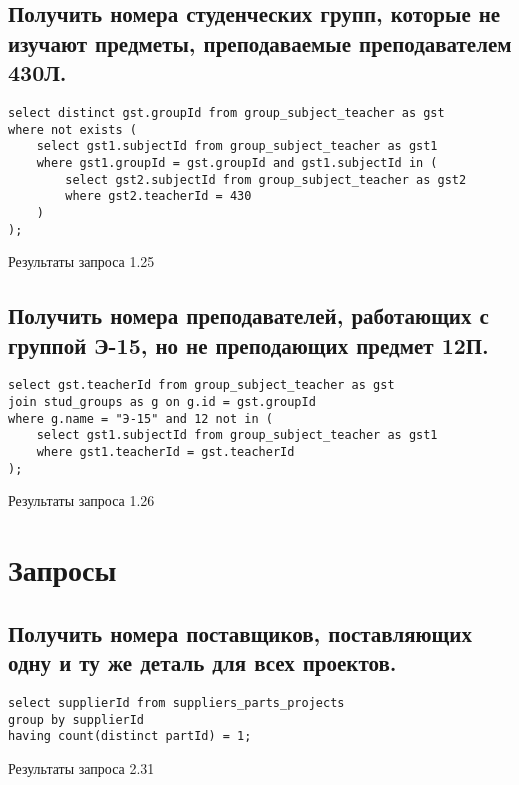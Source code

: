 \documentclass[a4paper,8pt]{article}
\begin{document}
\subsection{Получить номера студенческих групп, которые не изучают предметы, преподаваемые преподавателем 430Л.}
\begin{verbatim}
select distinct gst.groupId from group_subject_teacher as gst
where not exists (
	select gst1.subjectId from group_subject_teacher as gst1
    where gst1.groupId = gst.groupId and gst1.subjectId in (
		select gst2.subjectId from group_subject_teacher as gst2
        where gst2.teacherId = 430
    )
);
\end{verbatim}
\begin{table}[H]
\centering

\caption{Результаты запроса 1.25}
\end{table}

\subsection{Получить номера преподавателей, работающих с группой Э-15, но не преподающих предмет 12П.}
\begin{verbatim}
select gst.teacherId from group_subject_teacher as gst
join stud_groups as g on g.id = gst.groupId
where g.name = "Э-15" and 12 not in (
	select gst1.subjectId from group_subject_teacher as gst1
    where gst1.teacherId = gst.teacherId
);
\end{verbatim}
\begin{table}[H]
\centering

\caption{Результаты запроса 1.26}
\end{table}

\section{Запросы}

\subsection{Получить номера поставщиков, поставляющих одну и ту же деталь для всех проектов.}
\begin{verbatim}
select supplierId from suppliers_parts_projects
group by supplierId
having count(distinct partId) = 1;
\end{verbatim}
\begin{table}[H]
\centering

\caption{Результаты запроса 2.31}
\end{table}
\end{document}

